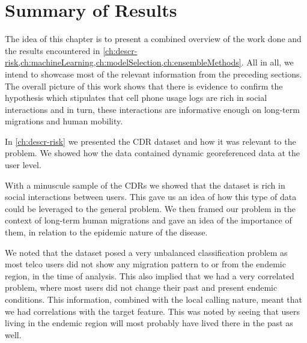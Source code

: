 



\chapter{Summary of Results}\label{ch:results}


The idea of this chapter is to present a combined overview of the work done and the results encountered in
\cref{ch:descr-risk,ch:machineLearning,ch:modelSelection,ch:ensembleMethods}.
All in all, we intend to showcase most of the relevant information from the preceding sections.
The overall picture of this work shows that there is evidence to confirm the hypothesis which stipulates that cell phone usage logs are rich in social interactions and in turn, these interactions are informative enough on long-term migrations and human mobility.


In \cref{ch:descr-risk} we presented the CDR dataset and how it was relevant to the problem.
We showed how the data contained dynamic georeferenced data at the user level.

With a minuscule sample of the CDRs we showed that the dataset is rich in social interactions between users.
This gave us an idea of how this type of data could be leveraged to the general problem.
We then framed our problem in the context of long-term human migrations and gave an idea of the importance of them, in relation to the epidemic nature of the disease.

We noted that the dataset posed a very unbalanced classification problem as most telco users did not show any migration pattern to or from the endemic region, in the time of analysis.
This also implied that we had a very correlated problem, where most users did not change their past and present endemic conditions.
This information, combined with the local calling nature, meant that we had correlations with the target feature.
This was noted by seeing that users living in the endemic region will most probably have lived there in the past as well.

